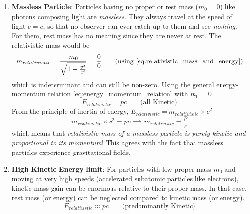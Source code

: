\documentclass[11pt, a4paper]{article}
\newcommand{\quotedsingle}[1]{#1}	%
\newcommand{\quotedsingleit}[1]{\quotedsingle{\textit{#1}}}	%
\newcommand{\eqrefnp}[1]{\textup{\ref{#1}}}  %
\begin{document}
\begin{enumerate}
		\item \textbf{Massless Particle}: Particles having no proper or rest mass ($m_{0} = 0$) like photons composing light are \quotedsingleit{massless}. They always travel at the speed of light $v=c$, so that no observer can ever catch up to them and see \textit{nothing}. For them, rest mass has no meaning since they are never at rest. The relativistic mass would be \cite{forshaw2014relativity}
		\begin{equation*}
			m_{relativistic} = \frac{m_{0}}{\sqrt{1 - \frac{v^{2}}{c^{2}}}} = \frac{0}{0} \tag{using \eqrefnp{eq:relativistic_mass_and_energy}}
		\end{equation*}
		which is indeterminant and can still be non-zero. Using the general energy-momentum relation \eqref{eq:energy_momentum_relation} with $m_{0} = 0$
		\begin{equation}\label{eq:E_equals_pc_massless}
			\boxed{E_{relativistic} = pc} \qquad \text{(all Kinetic)}
		\end{equation}
		From the principle of inertia of energy, $E_{relativistic} = m_{relativistic} \times c^{2}$
		\begin{equation}\label{eq:relativistic_mass_eq_p_by_c}
			m_{relativistic} \times c^{2} = pc \implies \boxed{m_{relativistic} = \frac{p}{c}}
		\end{equation}
		which means that \textit{relativistic mass of a massless particle is purely kinetic and proportional to its momentum}! This agrees with the fact that massless particles experience gravitational fields.
		
		\item \textbf{High Kinetic Energy limit}: For particles with low proper mass $m_{0}$ and moving at very high speeds (accelerated subatomic particles like electrons), kinetic mass gain can be enormous relative to their proper mass. In that case, rest mass (or energy) can be neglected compared to kinetic mass (or energy).
		\begin{equation}\label{eq:E_equals_pc_high_kinetic_energy}
			\boxed{E_{relativistic} \approx pc} \qquad \text{(predominantly Kinetic)}
		\end{equation}
		

\end{enumerate}
\end{document}
